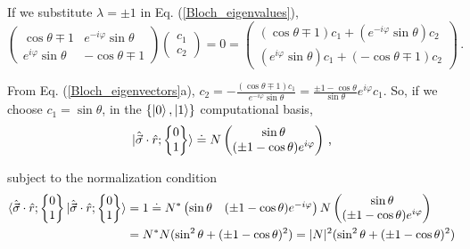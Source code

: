 \documentclass[11pt]{article}
\numberwithin{equation}{section} %
\numberwithin{figure}{section} %
\begin{document}
\begin{appendices}
If we substitute $\lambda=\pm 1$ in Eq. (\ref{Bloch_eigenvalues}),
\begin{equation} \label{Bloch_eigenvectors}
\begin{pmatrix}\cos\theta\mp 1&e^{-i\varphi}\sin\theta\\e^{i\varphi}\sin\theta&-\cos\theta\mp 1\end{pmatrix}\begin{pmatrix}c_1\\c_2\end{pmatrix}=0=\begin{pmatrix}(\cos\theta\mp 1)c_1+(e^{-i\varphi}\sin\theta)c_2\\(e^{i\varphi}\sin\theta)c_1+(-\cos\theta\mp 1)c_2\end{pmatrix}\,\textrm{.}
\end{equation}

From Eq. (\ref{Bloch_eigenvectors}a), $c_2=-\frac{(\cos\theta\mp 1)c_1}{e^{-i\varphi}\sin\theta}=\frac{\pm 1-\cos\theta}{\sin\theta}e^{i\varphi}c_1$. So, if we choose $c_1=\sin\theta$, in the $\{\ket{0},\ket{1}\}$ computational basis,
\begin{equation} \label{Bloch_eigenvectors2}
\ket{\hat{\vec{\sigma}}\cdot\hat{r};\begin{Bmatrix}0\\1\end{Bmatrix}}\doteq N\begin{pmatrix}\sin\theta\\(\pm 1-\cos\theta)e^{i\varphi}\end{pmatrix}\,\textrm{,}
\end{equation}

subject to the normalization condition
\begin{equation} \label{Block_normalization}
\begin{split}
\braket{\hat{\vec{\sigma}}\cdot\hat{r};\begin{Bmatrix}0\\1\end{Bmatrix}|\hat{\vec{\sigma}}\cdot\hat{r};\begin{Bmatrix}0\\1\end{Bmatrix}}
&=1\doteq N^*\begin{pmatrix}\sin\theta&(\pm 1-\cos\theta)e^{-i\varphi}\end{pmatrix} N\begin{pmatrix}\sin\theta\\(\pm 1-\cos\theta)e^{i\varphi}\end{pmatrix}\\
&=N^*N(\sin^2\theta+(\pm 1-\cos\theta)^2)=|N|^2(\sin^2\theta+(\pm 1-\cos\theta)^2)
\end{split}
\end{equation}


\end{appendices}
\end{document}
